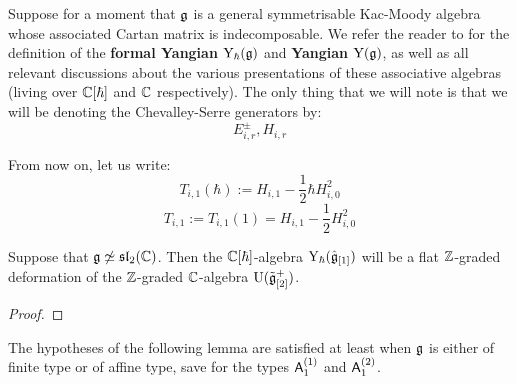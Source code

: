         \begin{convention}
            Suppose for a moment that $\mathfrak{g}$ is a general symmetrisable Kac-Moody algebra whose associated Cartan matrix is indecomposable. We refer the reader to \cite[Section 2]{guay_nakajima_wendlandt_affine_yangian_coproduct} for the definition of the \textbf{formal Yangian} $\mathrm{Y}_{\hbar}(\mathfrak{g})$ and \textbf{Yangian} $\mathrm{Y}(\mathfrak{g})$, as well as all relevant discussions about the various  presentations of these associative algebras (living over $\mathbb{C}[\hbar]$ and $\mathbb{C}$ respectively). The only thing that we will note is that we will be denoting the Chevalley-Serre generators by:
                $$E_{i, r}^{\pm}, H_{i, r}$$
        \end{convention}
        \begin{convention}
            From now on, let us write:
                $$T_{i, 1}(\hbar) := H_{i, 1} - \frac12 \hbar H_{i, 0}^2$$
                $$T_{i, 1} := T_{i, 1}(1) = H_{i, 1} - \frac12 H_{i, 0}^2$$
        \end{convention}
         \begin{lemma} \label{lemma: affine_formal_yangians_as_flat_graded_deformations}
             \cite{guay_nakajima_wendlandt_affine_yangian_vertex_representations_and_PBW} Suppose that $\mathfrak{g} \not \simeq \mathfrak{sl}_2(\mathbb{C})$. Then the $\mathbb{C}[\hbar]$-algebra $\mathrm{Y}_{\hbar}(\hat{\mathfrak{g}}_{[1]})$ will be a flat $\mathbb{Z}$-graded deformation of the $\mathbb{Z}$-graded $\mathbb{C}$-algebra $\mathrm{U}(\tilde{\mathfrak{g}}_{[2]}^+)$. 
         \end{lemma}
            \begin{proof}
            \end{proof}
        The hypotheses of the following lemma are satisfied at least when $\mathfrak{g}$ is either of finite type or of affine type, save for the types $\mathsf{A}_1^{(1)}$ and $\mathsf{A}_1^{(2)}$.
